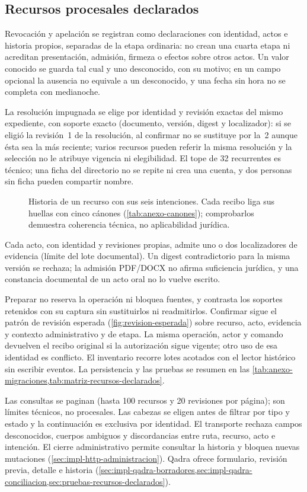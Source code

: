 \subsection{Recursos procesales declarados}\label{sec:impl-recursos-declarados}

Revocación y apelación se registran como declaraciones con identidad, actos e historia propios, separadas de la etapa ordinaria: no crean una cuarta etapa ni acreditan presentación, admisión, firmeza o efectos sobre otros actos. Un valor conocido se guarda tal cual y uno desconocido, con su motivo; en un campo opcional la ausencia no equivale a un desconocido, y una fecha sin hora no se completa con medianoche.

La resolución impugnada se elige por identidad y revisión exactas del mismo expediente, con soporte exacto (documento, versión, digest y localizador): si se eligió la revisión~1 de la resolución, al confirmar no se sustituye por la~2 aunque ésta sea la más reciente; varios recursos pueden referir la misma resolución y la selección no le atribuye vigencia ni elegibilidad. El tope de 32 recurrentes es técnico; una ficha del directorio no se repite ni crea una cuenta, y dos personas sin ficha pueden compartir nombre.

\begin{figure}[!htbp]
  \centering
  
  \caption{Historia de un recurso con sus seis intenciones. Cada recibo liga sus huellas con cinco cánones (\cref{tab:anexo-canones}); comprobarlos demuestra coherencia técnica, no aplicabilidad jurídica.}
  \label{fig:impl-rec-historia}
\end{figure}

Cada acto, con identidad y revisiones propias, admite uno o dos localizadores de evidencia (límite del lote documental). Un digest contradictorio para la misma versión se rechaza; la admisión PDF/DOCX no afirma suficiencia jurídica, y una constancia documental de un acto oral no lo vuelve escrito.

Preparar no reserva la operación ni bloquea fuentes, y contrasta los soportes retenidos con su captura sin sustituirlos ni readmitirlos. Confirmar sigue el patrón de revisión esperada (\cref{fig:revision-esperada}) sobre recurso, acto, evidencia y contexto administrativo y de etapa. La misma operación, actor y comando devuelven el recibo original si la autorización sigue vigente; otro uso de esa identidad es conflicto. El inventario recorre lotes acotados con el lector histórico sin escribir eventos. La persistencia y las pruebas se resumen en las \cref{tab:anexo-migraciones,tab:matriz-recursos-declarados}.

Las consultas se paginan (hasta 100 recursos y 20 revisiones por página); son límites técnicos, no procesales. Las cabezas se eligen antes de filtrar por tipo y estado y la continuación es exclusiva por identidad. El transporte rechaza campos desconocidos, cuerpos ambiguos y discordancias entre ruta, recurso, acto e intención. El cierre administrativo permite consultar la historia y bloquea nuevas mutaciones (\cref{sec:impl-http-administracion}). Qadra ofrece formulario, revisión previa, detalle e historia (\cref{sec:impl-qadra-borradores,sec:impl-qadra-conciliacion,sec:pruebas-recursos-declarados}).
